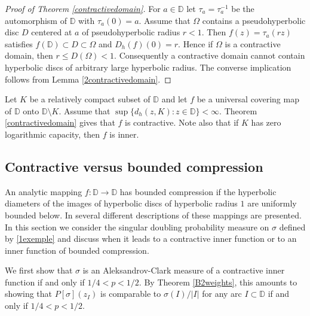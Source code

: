 \documentclass[a4paper,12pt]{article}
\theoremstyle{definition}
\numberwithin{equation}{section}
\newcommand{\D}{\mathbb D}
\begin{document}
\begin{proof}[Proof of Theorem \ref{contractivedomain}]
    
For $a \in \D$ let $\tau_a =\tau^{-1}_a$ be the automorphism of $\D$ with $\tau_a (0)=a$. Assume that $\Omega$ contains a pseudohyperbolic disc $D$ centered at $a$ of pseudohyperbolic radius $r<1$. Then $f(z)=\tau_a (r z)$ satisfies $f(\D) \subset D \subset \Omega$ and $D_h (f) (0) = r$. Hence if $\Omega$ is a contractive domain, then $r \leq D(\Omega) < 1$. Consequently a contractive domain cannot contain hyperbolic discs of arbitrary large hyperbolic radius. The converse implication follows from Lemma \ref{2contractivedomain}.
\end{proof}

Let $K$ be a relatively compact subset of $\D$ and let $f$ be a universal covering map of $\D$ onto $ \D \setminus K$. Assume that $\sup \{d_h (z , K) : z \in \D \} < \infty$. Theorem \ref{contractivedomain} gives that $f$ is contractive. Note also that if $K$ has zero logarithmic capacity, then $f$ is inner. 

\subsection{Contractive versus bounded compression}

An analytic mapping $f : \D \rightarrow \D$ has bounded compression if the hyperbolic diameters of the images of hyperbolic discs of hyperbolic radius $1$ are uniformly bounded below. In \cite{ivriinicolau2025} several different descriptions of these mappings are presented. In this section we consider the singular doubling probability measure on $\sigma$ defined by \eqref{1exemple} 
and discuss when it leads to a contractive inner function or to an inner function of bounded compression.

We first show that $\sigma$ is an Aleksandrov-Clark measure of a contractive inner function  if and only if  $1 / 4<p<1 / 2$. By Theorem \ref{B2weights}, this amounts to showing that $P[\sigma]\left(z_{I}\right)$ is comparable to $ \sigma(I) / |I|$ for any arc $I \subset \D $ if and only if $1 / 4<p<1 / 2$.
\end{document}
